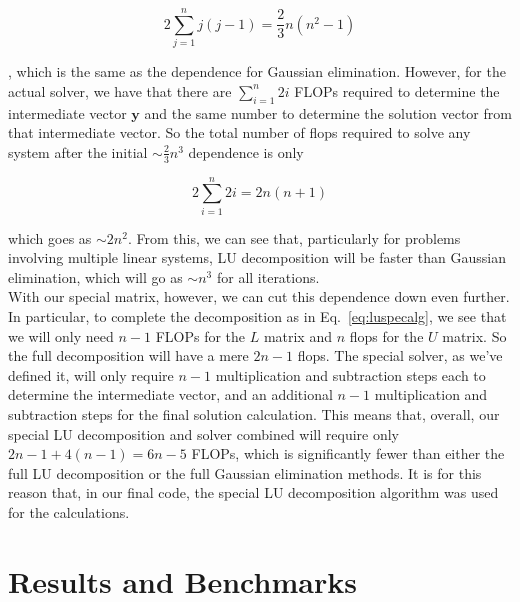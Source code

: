 \documentclass[12pt]{article}
\numberwithin{equation}{section}
\begin{document}
$$2\sum_{j=1}^{n}j\left(j-1\right) = \frac{2}{3}n\left(n^{2}-1\right)$$

\noindent[3], which is the same as the dependence for Gaussian elimination.  However, for the actual solver, we have that there are $\sum_{i=1}^{n}2i$ FLOPs required to determine the intermediate vector $\textbf{y}$ and the same number to determine the solution vector from that intermediate vector.  So the total number of flops required to solve any system after the initial $\sim\frac{2}{3}n^{3}$ dependence is only 

$$2\sum_{i=1}^{n}2i = 2n\left(n+1\right)$$

\noindent[3] which goes as $\sim2n^{2}$.  From this, we can see that, particularly for problems involving multiple linear systems, LU decomposition will be faster than Gaussian elimination, which will go as $\sim n^{3}$ for all iterations.
\\\indent With our special matrix, however, we can cut this dependence down even further.  In particular, to complete the decomposition as in Eq.~\ref{eq:luspecalg}, we see that we will only need $n-1$ FLOPs for the $L$ matrix and $n$ flops for the $U$ matrix.  So the full decomposition will have a mere $2n-1$ flops.  The special solver, as we've defined it, will only require $n-1$ multiplication and subtraction steps each to determine the intermediate vector, and an additional $n-1$ multiplication and subtraction steps for the final solution calculation.  This means that, overall, our special LU decomposition and solver combined will require only $2n-1+4\left(n-1\right) = 6n-5$ FLOPs, which is significantly fewer than either the full LU decomposition or the full Gaussian elimination methods.  It is for this reason that, in our final code, the special LU decomposition algorithm was used for the calculations.

\section{Results and Benchmarks}
\label{sec:results}
\end{document}
